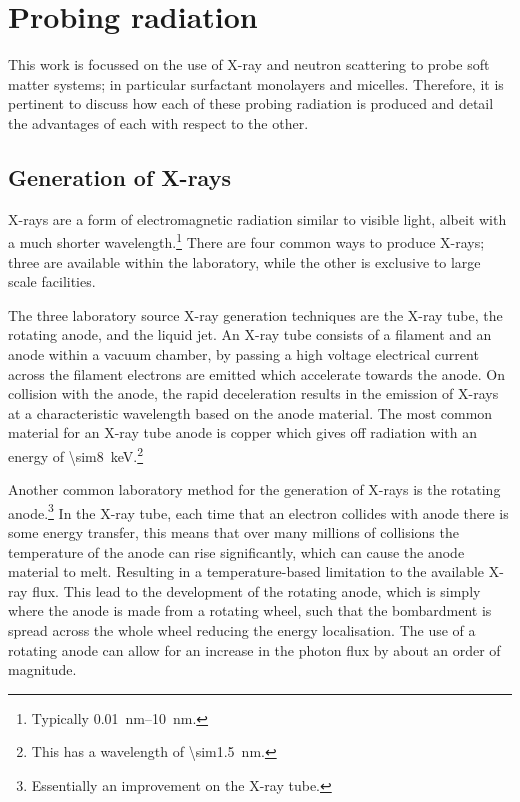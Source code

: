 \section{Probing radiation}
This work is focussed on the use of X-ray and neutron scattering to probe soft matter systems; in particular surfactant monolayers and micelles. Therefore, it is pertinent to discuss how each of these probing radiation is produced and detail the advantages of each with respect to the other.

\subsection{Generation of X-rays}
X-rays are a form of electromagnetic radiation similar to visible light, albeit with a much shorter wavelength.\footnote{Typically \SIrange{0.01}{10}{\nano\meter}.}
There are four common ways to produce X-rays; three are available within the laboratory, while the other is exclusive to large scale facilities.

The three laboratory source X-ray generation techniques are the X-ray tube, the rotating anode, and the liquid jet.
An X-ray tube consists of a filament and an anode within a vacuum chamber, by passing a high voltage electrical current across the filament electrons are emitted which accelerate towards the anode.
On collision with the anode, the rapid deceleration results in the emission of X-rays at a characteristic wavelength based on the anode material.\autocite{schnablegger_saxs_2017}
The most common material for an X-ray tube anode is copper which gives off radiation with an energy of \SI{\sim8}{\kilo\eV}.\footnote{This has a wavelength of \SI{\sim1.5}{\nano\meter}.}

Another common laboratory method for the generation of X-rays is the rotating anode.\footnote{Essentially an improvement on the X-ray tube.}
In the X-ray tube, each time that an electron collides with anode there is some energy transfer, this means that over many millions of collisions the temperature of the anode can rise significantly, which can cause the anode material to melt.
Resulting in a temperature-based limitation to the available X-ray flux.
This lead to the development of the rotating anode, which is simply where the anode is made from a rotating wheel, such that the bombardment is spread across the whole wheel reducing the energy localisation.
The use of a rotating anode can allow for an increase in the photon flux by about an order of magnitude.\autocite{schnablegger_saxs_2017}

